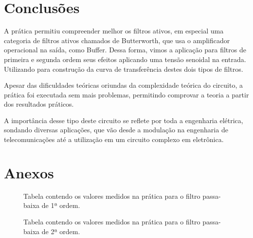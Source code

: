 \section{Conclusões}

A prática permitiu compreender melhor os filtros ativos, em especial uma categoria de filtros ativos chamados de Butterworth, que usa o amplificador operacional na saída, como Buffer. Dessa forma, vimos a aplicação para filtros de primeira e segunda ordem seus efeitos aplicando uma tensão senoidal na entrada. Utilizando para construção da curva de transferência destes dois tipos de filtros.

Apesar das dificuldades teóricas oriundas da complexidade teórica do circuito, a prática foi executada sem mais problemas, permitindo comprovar a teoria a partir dos resultados práticos.

A importância desse tipo deste circuito se reflete por toda a engenharia elétrica, sondando diversas aplicações, que vão desde a modulação na engenharia de telecomunicações até a utilização em um circuito complexo em eletrônica.

\newpage

\section{Anexos}

\vspace{60pt}
\begin{figure}[htbp!]
    \centering
    \vspace{16cm}
		  
	\caption{Tabela contendo os valores medidos na prática para o filtro passa-baixa de 1ª ordem.}
	\label{table:1}
\end{figure}

\newpage

\begin{figure}[htbp!]
	\centering
	\vspace{19cm}
	     
	\caption{Tabela contendo os valores medidos na prática para o filtro passa-baixa de 2ª ordem.}
	\label{table:2}
\end{figure}
